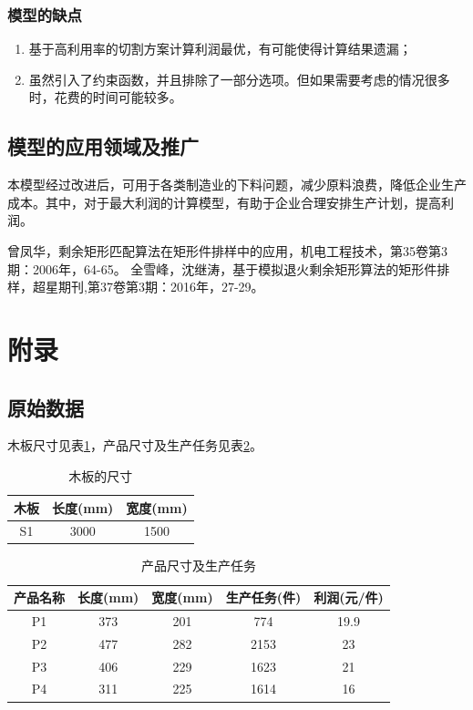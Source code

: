 \documentclass[hyperref,UTF8]{article}
\renewcommand\appendix{\setcounter{secnumdepth}{-2}}
\begin{document}
{\subsubsection{模型的缺点}
\begin{enumerate}
\item 基于高利用率的切割方案计算利润最优，有可能使得计算结果遗漏；
\item 虽然引入了约束函数，并且排除了一部分选项。但如果需要考虑的情况很多时，花费的时间可能较多。
\end{enumerate}

\subsection{模型的应用领域及推广}
本模型经过改进后，可用于各类制造业的下料问题，减少原料浪费，降低企业生产成本。其中，对于最大利润的计算模型，有助于企业合理安排生产计划，提高利润。
\newpage
\begin{thebibliography}{99}
曾凤华，剩余矩形匹配算法在矩形件排样中的应用，机电工程技术，第35卷第3期：2006年，64-65。
全雪峰，沈继涛，基于模拟退火剩余矩形算法的矩形件排样，超星期刊,第37卷第3期：2016年，27-29。
\end{thebibliography}
\newpage
\appendix
\section{附录}
\subsection{原始数据}
木板尺寸见表\ref{xinxi1}，产品尺寸及生产任务见表\ref{xinxi2}。
\begin{table}[htbp]
  \centering
  \caption{木板的尺寸}\label{xinxi1}%
\begin{tabular}{|c|c|c|}
\hline
木板 &长度(mm)&宽度(mm)\\
\hline
S1 & 3000 & 1500 \\
\hline
\end{tabular}%

\end{table}%


\begin{table}[htbp]
  \centering
  \caption{产品尺寸及生产任务}\label{xinxi2}%
\begin{tabular}{|c|c|c|c|c|}
\hline
产品名称 & 长度(mm)& 宽度(mm) &生产任务(件) & 利润(元/件)\\
\hline
P1 & 373 & 201 & 774 & 19.9 \\
\hline
P2 & 477 & 282 & 2153 & 23 \\
\hline
P3 & 406 & 229 & 1623 & 21 \\
\hline
P4 & 311 & 225 & 1614 & 16 \\
\hline
\end{tabular}%


\end{table}}
\end{document}
